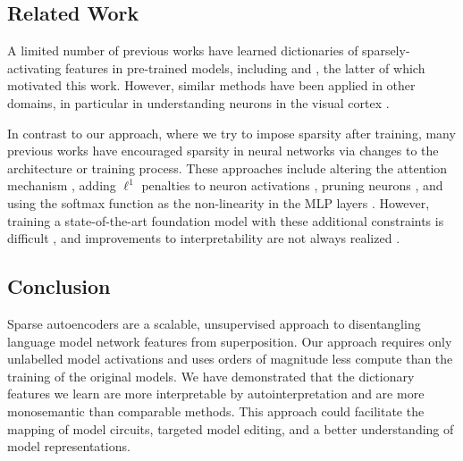 \subsection{Related Work}

A limited number of previous works have learned dictionaries of sparsely-activating features in pre-trained models, including \citet{yun2021transformer} and \citet{sharkey2023technical}, the latter of which motivated this work. However, similar methods have been applied in other domains, in particular in understanding neurons in the visual cortex \citep{olshausen2004sparse, wright2022high}. 

In contrast to our approach, where we try to impose sparsity after training, many previous works have encouraged sparsity in neural networks via changes to the architecture or training process. These approaches include altering the attention mechanism \citep{correia2019adaptively}, adding $\ell^1$ penalties to neuron activations \citep{kasioumis2021elite, georgiadis2019accelerating}, pruning neurons \citep{frankle2018lottery}, and using the softmax function as the non-linearity in the MLP layers \citep{elhage2022solu}. However, training a state-of-the-art foundation model with these additional constraints is difficult \citep{elhage2022solu}, and improvements to interpretability are not always realized \citep{Meister2021IsSA}.

\subsection{Conclusion}

Sparse autoencoders are a scalable, unsupervised approach to disentangling language model network features from superposition. Our approach requires only unlabelled model activations and uses orders of magnitude less compute than the training of the original models. We have demonstrated that the dictionary features we learn are more interpretable by autointerpretation and are more monosemantic than comparable methods. This approach could facilitate the mapping of model circuits, targeted model editing, and a better understanding of model representations.
